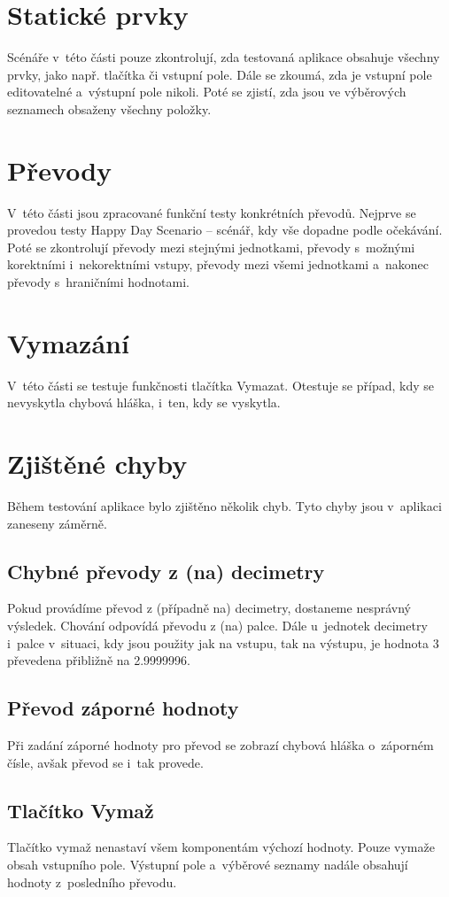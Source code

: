 	\section{Statické prvky}
	Scénáře v~této části pouze zkontrolují, zda testovaná aplikace obsahuje všechny prvky, jako např. tlačítka či vstupní pole. Dále se zkoumá, zda je vstupní pole editovatelné a~výstupní pole nikoli. Poté se zjistí, zda jsou ve výběrových seznamech obsaženy všechny položky.
	
	\section{Převody}
	V~této části jsou zpracované funkční testy konkrétních převodů. Nejprve se provedou testy Happy Day Scenario -- scénář, kdy vše dopadne podle očekávání. Poté se zkontrolují převody mezi stejnými jednotkami, převody s~možnými korektními i~nekorektními vstupy, převody mezi všemi jednotkami a~nakonec převody s~hraničními hodnotami.
	
	\section{Vymazání}
	V~této části se testuje funkčnosti tlačítka Vymazat. Otestuje se případ, kdy se nevyskytla chybová hláška, i~ten, kdy se vyskytla.
	
	\section{Zjištěné chyby}
	Během testování aplikace bylo zjištěno několik chyb. Tyto chyby jsou v~aplikaci zaneseny záměrně.
	
		\subsection{Chybné převody z (na) decimetry}
		Pokud provádíme převod z (případně na) decimetry, dostaneme nesprávný výsledek. Chování odpovídá převodu z (na) palce. Dále u~jednotek decimetry i~palce v~situaci, kdy jsou použity jak na vstupu, tak na výstupu, je hodnota 3 převedena přibližně na 2.9999996.
		
		\subsection{Převod záporné hodnoty}
		Při zadání záporné hodnoty pro převod se zobrazí chybová hláška o~záporném čísle, avšak převod se i~tak provede.
		
		\subsection{Tlačítko Vymaž}
		Tlačítko vymaž nenastaví všem komponentám výchozí hodnoty. Pouze vymaže obsah vstupního pole. Výstupní pole a~výběrové seznamy nadále obsahují hodnoty z~posledního převodu.